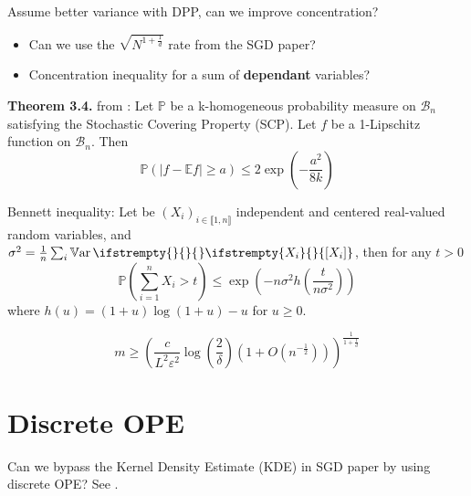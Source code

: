\documentclass{report} %
\renewcommand{\epsilon}{\varepsilon}
\newcommand{\PP}[2]{\mathbb{P} \ifstrempty{#1}{}{_{#1}} \ifstrempty{#2}{}{\left[#2\right]}}
\newcommand{\Var}[2]{\operatorname{\mathbb{V}ar} \ifstrempty{#1}{}{_{#1}} \ifstrempty{#2}{}{\left[#2\right]}}
\newcommand{\1}{\mathds{1}} %
\newcommand{\intint}[2]{\llbracket #1,#2 \rrbracket} %
\theoremstyle{definition}
\theoremstyle{definition} %
\begin{document}
\begin{tcolorbox}
	Assume better variance with DPP, can we improve concentration?
\begin{itemize}
	\item Can we use the $\sqrt {N^{1 + \frac 1 d}}$ rate from the SGD paper?
	\item Concentration inequality for a sum of \textbf{dependant} variables?
\end{itemize}
\end{tcolorbox}

\textbf{Theorem 3.4.} from \cite{pemantle2011rayleighconcentration}: Let $\mathbb{P}$ be a k-homogeneous probability measure on $\mathcal{B}_{n}$ satisfying the Stochastic Covering Property (SCP). Let $f$ be a 1-Lipschitz function on $\mathcal{B}_{n}$. Then
$$
\mathbb{P}(\lvert f-\mathbb{E} f \rvert \geq a) \leq 2 \exp \left(-\frac{a^{2}}{8 k}\right)
$$

Bennett inequality: Let be $(X_i)_{i\in \intint{1}{n}}$ independent and centered real-valued random variables, and $\sigma^2 = \frac{1}{n}\sum_i \Var{}{X_i}$, then for any $t>0$
$$
\mathbb{P}\left(\sum_{i=1}^{n} X_{i}>t\right) \leq \exp \left(-n \sigma^{2} h\left(\frac{t}{n \sigma^{2}}\right)\right)
$$
where $h(u)=(1+u) \log (1+u)-u$ for $u \geq 0$.







$$m \geq \left( \frac{c}{L^{2}\varepsilon ^{2}}\log \left( \frac{2}{\delta }\right) \left( 1+O\left( n^{-\frac{1}{2}}\right) \right) \right) ^{\frac{1}{1+\frac{1}{d}}}$$

\section{Discrete OPE}
\begin{tcolorbox}
	Can we bypass the Kernel Density Estimate (KDE) in SGD paper by using discrete OPE? See \cite{gautschi2004ope}.

\end{tcolorbox}
\end{document}
